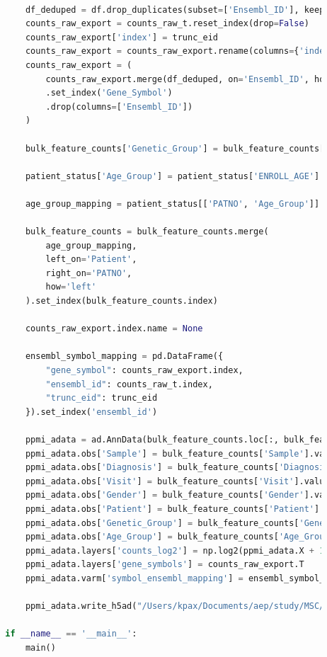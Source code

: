 \documentclass[12pt]{report}
\begin{document}
\begin{lstlisting}[language=Python,caption={data\_consolidation.py: Συγχώνευση δεδομένων σε H5AD τύπο αρχείου}, label=lst:dataconsolidationpy]
        
            df_deduped = df.drop_duplicates(subset=['Ensembl_ID'], keep='first')
            counts_raw_export = counts_raw_t.reset_index(drop=False)
            counts_raw_export['index'] = trunc_eid
            counts_raw_export = counts_raw_export.rename(columns={'index':'Ensembl_ID'})
            counts_raw_export = (
                counts_raw_export.merge(df_deduped, on='Ensembl_ID', how='left')
                .set_index('Gene_Symbol')
                .drop(columns=['Ensembl_ID'])
            )
        
            bulk_feature_counts['Genetic_Group'] = bulk_feature_counts['Genetic_Group'].fillna('Unknown')
        
            patient_status['Age_Group'] = patient_status['ENROLL_AGE'].apply(map_age_group)
        
            age_group_mapping = patient_status[['PATNO', 'Age_Group']]
        
            bulk_feature_counts = bulk_feature_counts.merge(
                age_group_mapping,
                left_on='Patient',
                right_on='PATNO',
                how='left'
            ).set_index(bulk_feature_counts.index)
        
            counts_raw_export.index.name = None
        
            ensembl_symbol_mapping = pd.DataFrame({
                "gene_symbol": counts_raw_export.index,
                "ensembl_id": counts_raw_t.index,
                "trunc_eid": trunc_eid
            }).set_index('ensembl_id')
        
            ppmi_adata = ad.AnnData(bulk_feature_counts.loc[:, bulk_feature_counts.columns.str.startswith("ENSG")])
            ppmi_adata.obs['Sample'] = bulk_feature_counts['Sample'].values
            ppmi_adata.obs['Diagnosis'] = bulk_feature_counts['Diagnosis'].values
            ppmi_adata.obs['Visit'] = bulk_feature_counts['Visit'].values
            ppmi_adata.obs['Gender'] = bulk_feature_counts['Gender'].values
            ppmi_adata.obs['Patient'] = bulk_feature_counts['Patient'].values
            ppmi_adata.obs['Genetic_Group'] = bulk_feature_counts['Genetic_Group'].values
            ppmi_adata.obs['Age_Group'] = bulk_feature_counts['Age_Group'].values
            ppmi_adata.layers['counts_log2'] = np.log2(ppmi_adata.X + 1)
            ppmi_adata.layers['gene_symbols'] = counts_raw_export.T
            ppmi_adata.varm['symbol_ensembl_mapping'] = ensembl_symbol_mapping
        
            ppmi_adata.write_h5ad("/Users/kpax/Documents/aep/study/MSC/lab/PPMI_Project_133_RNASeq/ppmi_adata.h5ad")
        
        if __name__ == '__main__':
            main()
    \end{lstlisting}
\end{document}
